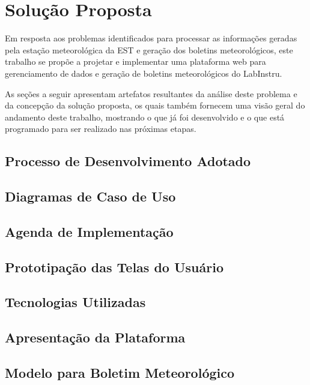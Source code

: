 \chapter{Solução Proposta} \label{cap:solucao}

Em resposta aos problemas identificados para processar as informações geradas pela estação meteorológica da EST e geração dos boletins meteorológicos, este trabalho se propõe a projetar e implementar uma plataforma web para gerenciamento de dados e geração de boletins meteorológicos do LabInstru.

As seções a seguir apresentam artefatos resultantes da análise deste problema e da concepção da solução proposta, os quais também fornecem uma visão geral do andamento deste trabalho, mostrando o que já foi desenvolvido e o que está programado para ser realizado nas próximas etapas.

\section{Processo de Desenvolvimento Adotado}


\section{Diagramas de Caso de Uso}


\section{Agenda de Implementação} \label{sec:agenda}


\section{Prototipação das Telas do Usuário}


\section{Tecnologias Utilizadas}


\section{Apresentação da Plataforma}


\section{Modelo para Boletim Meteorológico}

